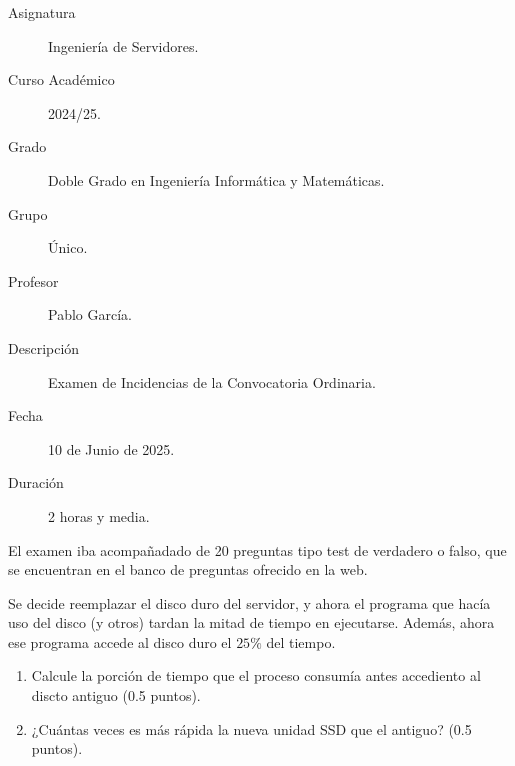 \documentclass[12pt]{article}
\begin{document}

    
    

    \begin{description}
        \item[Asignatura] Ingeniería de Servidores.
        \item[Curso Académico] 2024/25.
        \item[Grado] Doble Grado en Ingeniería Informática y Matemáticas.
        \item[Grupo] Único.
        \item[Profesor] Pablo García.
        \item[Descripción] Examen de Incidencias de la Convocatoria Ordinaria.
        \item[Fecha] 10 de Junio de 2025.
        \item[Duración] 2 horas y media.
    
    \end{description}
    \newpage


    
    El examen iba acompañadado de 20 preguntas tipo test de verdadero o falso, que se encuentran en el banco de preguntas ofrecido en la web.

    \begin{ejercicio}[2 puntos]
        Se decide reemplazar el disco duro del servidor, y ahora el programa que hacía uso del disco (y otros) tardan la mitad de tiempo en ejecutarse. Además, ahora ese programa accede al disco duro el $25\%$ del tiempo.
        \begin{enumerate}[label=\alph*)]
            \item Calcule la porción de tiempo que el proceso consumía antes accediento al discto antiguo (0.5 puntos).
            \item ¿Cuántas veces es más rápida la nueva unidad SSD que el antiguo? (0.5 puntos).
        \end{enumerate}
    \end{ejercicio}
\end{document}
